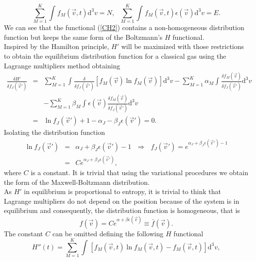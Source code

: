 \documentclass{article}
\begin{document}
\begin{equation}
    \sum_{M=1}^{K}\int_{}^{}f_M(\vec{v},t)\mathrm{d}^3v =N, \ \ \ \sum_{M=1}^{K}\int_{}^{}f_M(\vec{v},t)\epsilon(\vec{v})\mathrm{d}^3v =E \label{micro}.
\end{equation}
We can see that the functional (\ref{CH2}) contains a non-homogeneous distribution function but keeps the same form of the Boltzmann's $H$ functional.\\
Inspired by the Hamilton principle, $H'$ will be maximized with those restrictions to obtain the equilibrium distribution function for a classical gas using the Lagrange multipliers method obtaining
\begin{eqnarray}
    \frac{\delta H'}{\delta f_J(\vec{v}')}&=&\sum_{M=1}^{K}\int_{}^{}\frac{\delta}{\delta f_J(\vec{v}')}\left[f_M(\vec{v})\ln f_M(\vec{v})  \right]\mathrm{d}^3v -\sum_{M=1}^{K}\alpha_M\int_{}^{}\frac{\delta f_M(\vec{v})}{\delta f_J(\vec{v}')}\mathrm{d}^3v \nonumber \\
    &&-\sum_{M=1}^{K}\beta_M \int_{}^{}\epsilon(\vec{v})\frac{\delta f_M(\vec{v})}{\delta f_J(\vec{v}')}\mathrm{d}^3v \nonumber \\
    &=&\ln f_J(\vec{v}')+1-\alpha_J-\beta_J \epsilon(\vec{v}')=0.
\end{eqnarray}
Isolating the distribution function 
\begin{eqnarray}
    \ln f_J(\vec{v}')&=&\alpha_J+\beta_J \epsilon(\vec{v}')-1 \ \ \  \Rightarrow \ \ \ f_J(\vec{v}')=e^{\alpha_J +\beta_J \epsilon(\vec{v}')-1} \nonumber \\
    &=&Ce^{\alpha_J+\beta_J \epsilon(\vec{v}') } \label{relacion1},
\end{eqnarray}
where $C$ is a constant. It is trivial that using the variational procedures we obtain the form of the Maxwell-Boltzmann distribution. \\
As $H'$ in equilibrium is proportional to entropy, it is trivial to think that Lagrange multipliers do not depend on the position because of the system is in equilibrium and consequently, the distribution function is homogeneous, that is
\begin{equation}
    f(\vec{v})=Ce^{\alpha+\beta \epsilon(\vec{v})}\equiv \bar{f}(\vec{v}).
\end{equation}{} 
The constant $C$ can be omitted defining the following $H$ functional
\begin{equation}
   H''(t)=\sum_{M=1}^{K}\int_{}^{} \left[f_M(\vec{v},t) \ln f_M(\vec{v},t)-f_M(\vec{v},t)\right]\mathrm{d}^3v  \label{CH3},
\end{equation}
\end{document}
